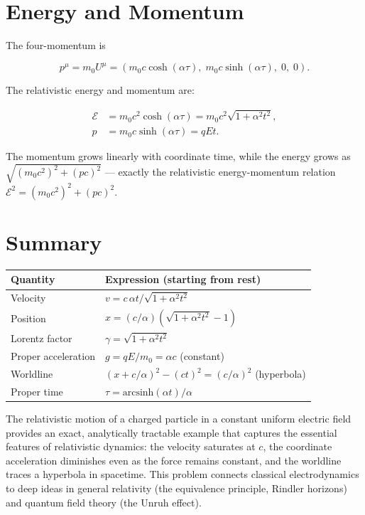 \section{Energy and Momentum}

The four-momentum is

\begin{equation}
p^\mu = m_0 U^\mu = \left(m_0 c\cosh(\alpha\tau),\; m_0 c\sinh(\alpha\tau),\; 0,\; 0\right).
\end{equation}

The relativistic energy and momentum are:

\begin{align}
\mathcal{E} &= m_0 c^2\cosh(\alpha\tau) = m_0 c^2\sqrt{1 + \alpha^2 t^2}, \\
p &= m_0 c\sinh(\alpha\tau) = qEt.
\end{align}

The momentum grows linearly with coordinate time, while the energy grows as $\sqrt{(m_0c^2)^2 + (pc)^2}$ --- exactly the relativistic energy-momentum relation $\mathcal{E}^2 = (m_0c^2)^2 + (pc)^2$.

\section{Summary}

\begin{table}[h]
\centering
\renewcommand{\arraystretch}{1.5}
\begin{tabular}{ll}
\toprule
\textbf{Quantity} & \textbf{Expression (starting from rest)} \\
\midrule
Velocity & $v = c\,\alpha t/\sqrt{1+\alpha^2t^2}$ \\
Position & $x = (c/\alpha)(\sqrt{1+\alpha^2t^2}-1)$ \\
Lorentz factor & $\gamma = \sqrt{1+\alpha^2t^2}$ \\
Proper acceleration & $g = qE/m_0 = \alpha c$ (constant) \\
Worldline & $(x+c/\alpha)^2 - (ct)^2 = (c/\alpha)^2$ (hyperbola) \\
Proper time & $\tau = \text{arcsinh}(\alpha t)/\alpha$ \\
\bottomrule
\end{tabular}
\end{table}

The relativistic motion of a charged particle in a constant uniform electric field provides an exact, analytically tractable example that captures the essential features of relativistic dynamics: the velocity saturates at $c$, the coordinate acceleration diminishes even as the force remains constant, and the worldline traces a hyperbola in spacetime. This problem connects classical electrodynamics to deep ideas in general relativity (the equivalence principle, Rindler horizons) and quantum field theory (the Unruh effect).
